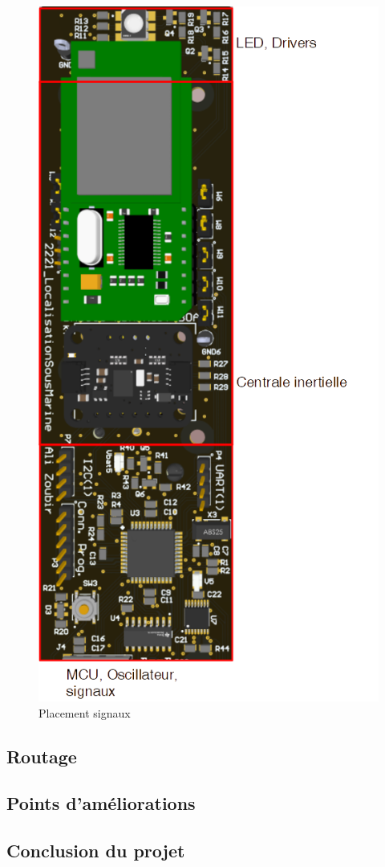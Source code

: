 {\begin{figure}[h]
	\centering
	\includegraphics[width=0.7\linewidth]{Figures/hautPCB}
	\caption{Placement signaux}
	\label{fig:hautpcb}
\end{figure}

	
}
\clearpage

\subsection{Routage} \label{ssec:routage}
{}
\clearpage

\subsection{Points d'améliorations} \label{ssec:pointAmel}
{}
\clearpage

\subsection{Conclusion du projet} \label{ssec:conclusionG}
{}
\clearpage